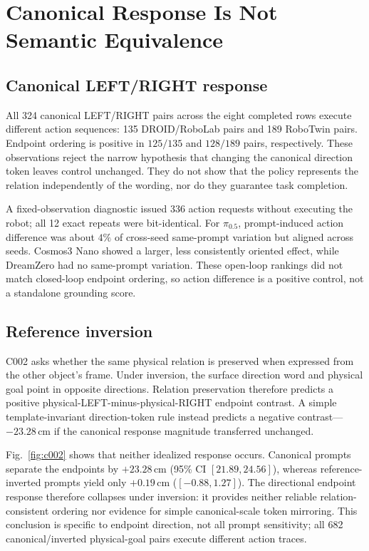 \section{Canonical Response Is Not Semantic Equivalence}
\label{sec:language}

\subsection{Canonical LEFT/RIGHT response}

All 324 canonical LEFT/RIGHT pairs across the eight completed rows execute different action sequences: 135 DROID/RoboLab pairs and 189 RoboTwin pairs. Endpoint ordering is positive in $125/135$ and $128/189$ pairs, respectively. These observations reject the narrow hypothesis that changing the canonical direction token leaves control unchanged. They do not show that the policy represents the relation independently of the wording, nor do they guarantee task completion.

A fixed-observation diagnostic issued 336 action requests without executing the robot; all 12 exact repeats were bit-identical. For $\pi_{0.5}$, prompt-induced action difference was about $4\%$ of cross-seed same-prompt variation but aligned across seeds. Cosmos3 Nano showed a larger, less consistently oriented effect, while DreamZero had no same-prompt variation. These open-loop rankings did not match closed-loop endpoint ordering, so action difference is a positive control, not a standalone grounding score.

\subsection{Reference inversion}

C002 asks whether the same physical relation is preserved when expressed from the other object's frame. Under inversion, the surface direction word and physical goal point in opposite directions. Relation preservation therefore predicts a positive physical-LEFT-minus-physical-RIGHT endpoint contrast. A simple template-invariant direction-token rule instead predicts a negative contrast---$-23.28$\,cm if the canonical response magnitude transferred unchanged.

Fig.~\ref{fig:c002} shows that neither idealized response occurs. Canonical prompts separate the endpoints by $+23.28$\,cm (95\% CI $[21.89,24.56]$), whereas reference-inverted prompts yield only $+0.19$\,cm ($[-0.88,1.27]$). The directional endpoint response therefore collapses under inversion: it provides neither reliable relation-consistent ordering nor evidence for simple canonical-scale token mirroring. This conclusion is specific to endpoint direction, not all prompt sensitivity; all 682 canonical/inverted physical-goal pairs execute different action traces.

